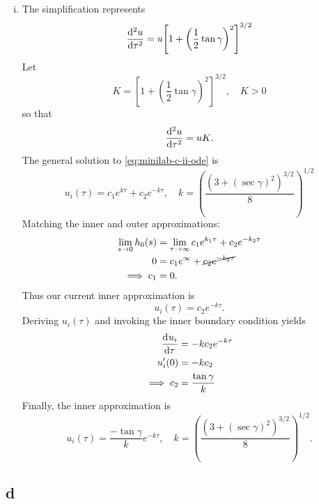 \documentclass[12pt,twoside]{article}
\begin{document}
\begin{enumerate}[(i)]
\item The simplification represents
  \begin{equation*}
    \od[2]{u}{\tau} = u{\left[ 1 + {\left( \frac{1}{2}\tan\gamma \right)}^2 \right]}^{3/2}
  \end{equation*}
  Let
  \begin{equation*}
    K = {\left[ 1 + {\left( \frac{1}{2}\tan\gamma \right)}^2 \right]}^{3/2}, \quad K>0
  \end{equation*}
  so that
  \begin{equation}
    \label{eq:minilab-c-ii-ode}
    \od[2]{u}{\tau} = uK.
  \end{equation}
  The general solution to \cref{eq:minilab-c-ii-ode} is
  \begin{equation*}
    u_i(\tau) = c_1e^{k \tau} + c_2e^{-k \tau},\quad k={\left(\frac{{(3+(\sec\gamma)^2)}^{3/2}}{8}\right)}^{1/2}
  \end{equation*}
  Matching the inner and outer approximations:
  \begin{equation*}
    \begin{aligned}
      \lim_{s\rightarrow0} h_0(s) &= \lim_{\tau\rightarrow\infty} c_1e^{k_1 \tau} + c_2e^{-k_2 \tau} \\
      0 &= c_1e^{\infty} + \cancel{c_2e^{-k_2 \tau}} \\
      \implies c_1 &= 0.
    \end{aligned}
  \end{equation*}
  Thus our current inner approximation is
  \begin{equation*}
    u_i(\tau) = c_2e^{-k \tau}.
  \end{equation*}
  Deriving $u_i(\tau)$ and invoking the inner boundary condition yields
  \begin{equation*}
    \begin{aligned}
      \od{u_i}{\tau} &= -k c_2e^{-k\tau} \\
      u_i'(0) &= -k c_2 \\
      \implies c_2 &= \frac{\tan\gamma}{k}
    \end{aligned}
  \end{equation*}
  Finally, the inner approximation is
  \begin{equation*}
    \boxed{u_i(\tau)=\frac{-\tan\gamma}{k}e^{-k\tau}, \quad k={\left(\frac{{(3+(\sec\gamma)^2)}^{3/2}}{8}\right)}^{1/2}.}
  \end{equation*}
\end{enumerate}

\subsection{d}
\label{sec:minilab-part-d}
\end{document}
